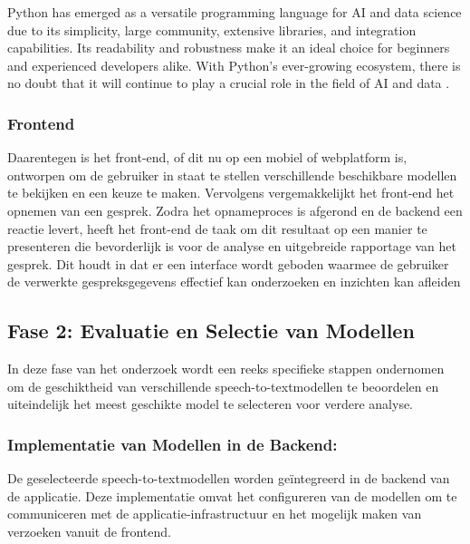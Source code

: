Python has emerged as a versatile programming language for AI and data science due to its simplicity, large community, extensive libraries, and integration capabilities. Its readability and robustness make it an ideal choice for beginners and experienced developers alike. With Python’s ever-growing ecosystem, there is no doubt that it will continue to play a crucial role in the field of AI and data \autocite{Hill2023}.

\subsubsection{Frontend}
Daarentegen is het front-end, of dit nu op een mobiel of webplatform is, ontworpen om de gebruiker in staat te stellen verschillende beschikbare modellen te bekijken en een keuze te maken. Vervolgens vergemakkelijkt het front-end het opnemen van een gesprek. Zodra het opnameproces is afgerond en de backend een reactie levert, heeft het front-end de taak om dit resultaat op een manier te presenteren die bevorderlijk is voor de analyse en uitgebreide rapportage van het gesprek. Dit houdt in dat er een interface wordt geboden waarmee de gebruiker de verwerkte gespreksgegevens effectief kan onderzoeken en inzichten kan afleiden

\subsection{Fase 2: Evaluatie en Selectie van Modellen}
In deze fase van het onderzoek wordt een reeks specifieke stappen ondernomen om de geschiktheid van verschillende speech-to-textmodellen te beoordelen en uiteindelijk het meest geschikte model te selecteren voor verdere analyse.
\subsubsection{Implementatie van Modellen in de Backend:}
De geselecteerde speech-to-textmodellen worden geïntegreerd in de backend van de applicatie. Deze implementatie omvat het configureren van de modellen om te communiceren met de applicatie-infrastructuur en het mogelijk maken van verzoeken vanuit de frontend.

